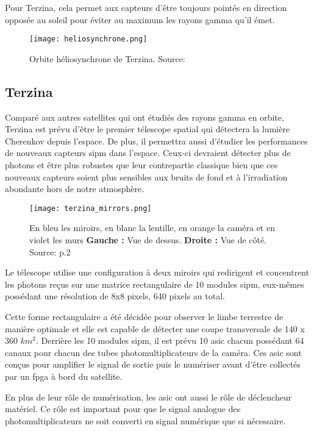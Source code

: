 Pour Terzina, cela permet aux capteurs d'être toujours pointés en direction opposée au soleil pour éviter au maximum les rayons gamma qu'il émet.

\begin{figure}[tbph!]
	\centering
	\texttt{[image: heliosynchrone.png]}
	\caption[Orbite héliosynchrone de Terzina]{Orbite héliosynchrone de Terzina. Source: \cite{Nuses}}
\end{figure}

\subsection{Terzina}
Comparé aux autres satellites qui ont étudiés des rayons gamma en orbite, Terzina est prévu d'être le premier télescope spatial
qui détectera la lumière Cherenkov depuis l'espace. De plus, il permettra aussi d'étudier les performances de nouveaux capteurs \gls{sipm}
dans l'espace. Ceux-ci devraient détecter plus de photons et être plus robustes que leur contrepartie classique bien que ces nouveaux capteurs
soient plus sensibles aux bruits de fond et à l'irradiation abondante hors de notre atmosphère.

\begin{figure}[tbph!]
	\centering
	\texttt{[image: terzina\_mirrors.png]}
	\caption[Vue de la configuration optique de Terzina]
	{En bleu les miroirs, en blanc la lentille, en orange la caméra et en violet les murs \textbf{Gauche :} Vue de dessus. \textbf{Droite :} Vue de côté. Source: \cite{Burmistrov_2023} p.2}
\end{figure}

Le télescope utilise une configuration à deux miroirs qui redirigent et concentrent les photons reçus sur une matrice 
rectangulaire de 10 modules \gls{sipm}, eux-mêmes possédant une résolution de 8x8 pixels, 640 pixels au total. \cite{Burmistrov_2023}

Cette forme rectangulaire a été décidée pour observer le limbe terrestre de manière optimale et elle est capable de détecter une coupe transversale de 140 x 360 $km^2$.
Derrière les 10 modules \gls{sipm}, il est prévu 10 \gls{asic} chacun possédant 64 canaux pour chacun des tubes photomultiplicateurs de la caméra.
Ces \gls{asic} sont conçus pour amplifier le signal de sortie puis le numériser avant d'être collectés par un \gls{fpga} à bord du satellite. 

En plus de leur rôle de numérisation, les \gls{asic} ont aussi le rôle de déclencheur matériel. 
Ce rôle est important pour que le signal analogue des photomultiplicateurs ne soit converti en signal numérique que si nécessaire. 

